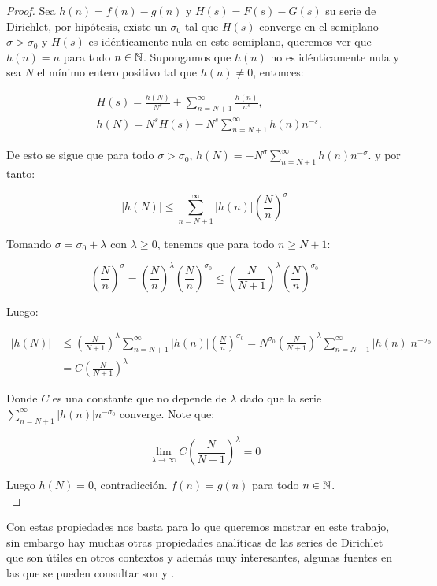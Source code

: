 \begin{proof}
Sea $h(n)=f(n)-g(n)$ y $H(s)=F(s)-G(s)$ su serie de Dirichlet, por hipótesis, existe un $\sigma_0$ tal que $H(s)$ converge en el semiplano $\sigma>\sigma_0$ y $H(s)$ es idénticamente nula en este semiplano, queremos ver que $h(n)=n$ para todo $n\in \mathbb{N}$. Supongamos que $h(n)$ no es idénticamente nula y sea $N$ el mínimo entero positivo tal que $h(n)\neq 0$, entonces:

\begin{align*}
    &H(s)=\frac{h(N)}{N^s}+\sum_{n=N+1}^{\infty} \frac{h(n)}{n^s},\\
    &h(N)=N^s H(s)-N^s \sum_{n=N+1}^{\infty} h(n) n^{-s}
.\end{align*}

De esto se sigue que para todo $\sigma>\sigma_0$, $h(N)=-N^{\sigma}\displaystyle \sum_{n=N+1}^{\infty} h(n) n^{-\sigma}.$ y por tanto:

$$\left|h(N)\right|\leq\sum_{n=N+1}^{\infty} |h(n)|\left(\frac{N}{n}\right)^{\sigma}
    $$

Tomando $\sigma=\sigma_0+\lambda$ con $\lambda\geq 0$, tenemos que para todo $n\geq N+1$:

$$\left(\frac{N}{n}\right)^{\sigma}=\left(\frac{N}{n}\right)^{\lambda}\left(\frac{N}{n}\right)^{\sigma_0}\leq \left(\frac{N}{N+1}\right)^{\lambda}\left(\frac{N}{n}\right)^{\sigma_0}$$

Luego:

$$\begin{aligned}
\left|h(N)\right|&\leq \left(\frac{N}{N+1}\right)^{\lambda}\sum_{n=N+1}^{\infty} |h(n)|\left(\frac{N}{n}\right)^{\sigma_0}=N^{\sigma_0}\left(\frac{N}{N+1}\right)^{\lambda}\sum_{n=N+1}^{\infty} |h(n)|n^{-\sigma_0}\\
&=C\left(\frac{N}{N+1}\right)^{\lambda}
\end{aligned}
    $$

Donde $C$ es una constante que no depende de $\lambda$ dado que la serie $\displaystyle \sum_{n=N+1}^{\infty} |h(n)|n^{-\sigma_0}$ converge. Note que:

$$\lim_{\lambda\to \infty} C\left(\frac{N}{N+1}\right)^{\lambda}=0$$

Luego $h(N)=0$, contradicción. $f(n)=g(n)$ para todo $n\in \mathbb{N}$.\\
\end{proof}

Con estas propiedades nos basta para lo que queremos mostrar en este trabajo, sin embargo hay muchas otras propiedades analíticas de las series de Dirichlet que son útiles en otros contextos y además muy interesantes, algunas fuentes en las que se pueden consultar son \cite{apostol1998introduction} y \cite{montgomery2007multiplicative}.

